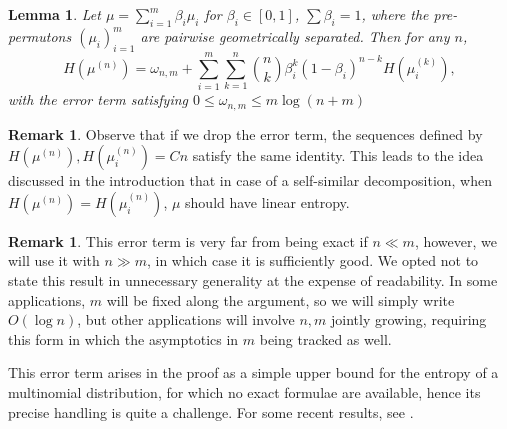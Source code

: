 \documentclass[11pt]{article}
\newtheorem{lemma}[theorem]{Lemma}
\theoremstyle{definition}
\newtheorem{megj}[theorem]{Remark}
\begin{document}
\begin{lemma} \label{lemma:geom_sep}
    Let $\mu = \sum_{i=1}^m\beta_i\mu_i$ for $\beta_i\in[0, 1]$, $\sum \beta_i=1$, where the pre-permutons $(\mu_i)_{i=1}^m$ are pairwise geometrically separated. Then for any $n$,
    $$H(\mu^{(n)})= \omega_{n, m} + \sum_{i=1}^{m}\sum_{k=1}^{n} \binom{n}{k}\beta_i^{k}(1-\beta_i)^{n-k}H(\mu_i^{(k)}),$$
    with the error term satisfying $0\leq \omega_{n, m} \leq m \log(n+m)$
\end{lemma}

\begin{megj}
    Observe that if we drop the error term, the sequences defined by $H(\mu^{(n)}), H(\mu_i^{(n)})=Cn$ satisfy the same identity. This leads to the idea discussed in the introduction that in case of a self-similar decomposition, when $H(\mu^{(n)})= H(\mu_i^{(n)})$, $\mu$ should have linear entropy.
\end{megj}

\begin{megj}
    This error term is very far from being exact if $n\ll m$, however, we will use it with $n\gg m$, in which case it is sufficiently good. We opted not to state this result in unnecessary generality at the expense of readability. In some applications, $m$ will be fixed along the argument, so we will simply write $O(\log n)$, but other applications will involve $n, m$ jointly growing, requiring this form in which the asymptotics in $m$ being tracked as well.

    This error term arises in the proof as a simple upper bound for the entropy of a multinomial distribution, for which no exact formulae are available, hence its precise handling is quite a challenge. For some recent results, see \cite{Kaji}.
\end{megj}
\end{document}
